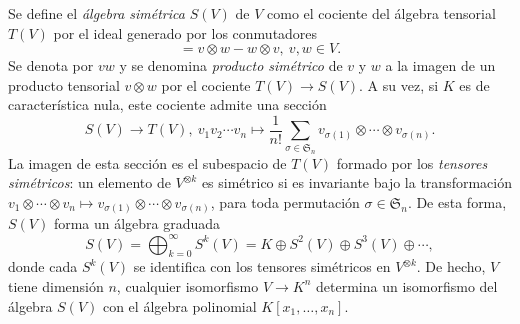 \documentclass[11pt,a4paper]{amsbook}
\theoremstyle{remark} \newtheorem{rmk}[subsection]{Observación}
\theoremstyle{definition} \newtheorem{defn}[subsection]{Definición}
\theoremstyle{definition} \newtheorem{ex}[subsection]{Ejemplo}
\theoremstyle{definition} \newtheorem{ej}[subsection]{Ejercicio}
\begin{document}
Se define el \emph{álgebra simétrica} $S(V)$ de $V$ como el cociente del álgebra tensorial $T(V)$ por el ideal generado por los conmutadores
\begin{equation*}
[v,w] = v\otimes w - w \otimes v, \ v, w\in V.
\end{equation*}
Se denota por $vw$ y se denomina \emph{producto simétrico} de $v$ y $w$ a la imagen de un producto tensorial $v\otimes w$ por el cociente $T(V)\rightarrow S(V)$. A su vez, si $K$ es de característica nula, este cociente admite una sección
\begin{equation*}
S(V) \rightarrow T(V), \  v_1v_2\cdots v_n \mapsto \frac{1}{n!} \sum_{\sigma \in \mathfrak{S}_n} v_{\sigma(1)} \otimes \cdots \otimes v_{\sigma(n)}.
\end{equation*}
La imagen de esta sección es el subespacio de $T(V)$ formado por los \emph{tensores simétricos}: un elemento de $V^{\otimes k}$ es simétrico si es invariante bajo la transformación $v_1\otimes \cdots \otimes v_n \mapsto v_{\sigma(1)} \otimes \cdots \otimes v_{\sigma(n)}$, para toda permutación $\sigma \in \mathfrak{S}_n$. De esta forma, $S(V)$ forma un álgebra graduada
\begin{equation*}
S(V) = \bigoplus_{k=0}^\infty S^k(V) = K \oplus S^2(V) \oplus S^3(V) \oplus \cdots,
\end{equation*}
donde cada $S^k(V)$ se identifica con los tensores simétricos en $V^{\otimes k}$.
De hecho, $V$ tiene dimensión $n$, cualquier isomorfismo $V\rightarrow K^n$ determina un isomorfismo del álgebra $S(V)$ con el álgebra polinomial $K[x_1,\dots,x_n]$.
\end{document}

